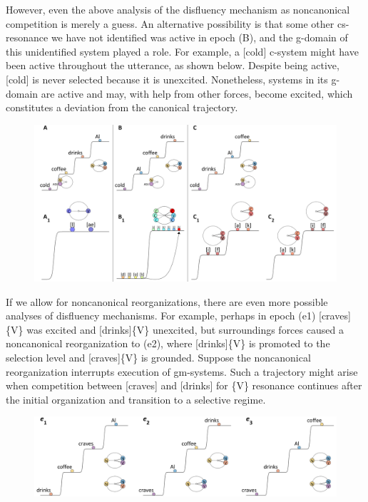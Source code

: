   However, even the above analysis of the disfluency mechanism as noncanonical competition is merely a guess. An alternative possibility is that some other cs-resonance we have not identified was active in epoch (B), and the g-domain of this unidentified system played a role. For example, a [cold] c-system might have been active throughout the utterance, as shown below. Despite being active, [cold] is never selected because it is unexcited. Nonetheless, systems in its g-domain are active and may, with help from other forces, become excited, which constitutes a deviation from the canonical trajectory.

  
\begin{figure}
\includegraphics[width=\textwidth]{figures/Tilsen-img59.png}
\caption{\missingcaption}
\label{fig:}
\end{figure}
 

  If we allow for noncanonical reorganizations, there are even more possible analyses of disfluency mechanisms. For example, perhaps in epoch (e1) [craves]\{V\} was excited and [drinks]\{V\} unexcited, but surroundings forces caused a noncanonical reorganization to (e2), where [drinks]\{V\} is promoted to the selection level and [craves]\{V\} is grounded. Suppose the noncanonical reorganization interrupts execution of gm-systems. Such a trajectory might arise when competition between [craves] and [drinks] for \{V\} resonance continues after the initial organization and transition to a selective regime. 

  
\begin{figure}
\includegraphics[width=\textwidth]{figures/Tilsen-img60.png}
\caption{\missingcaption}
\label{fig:}
\end{figure}
 

